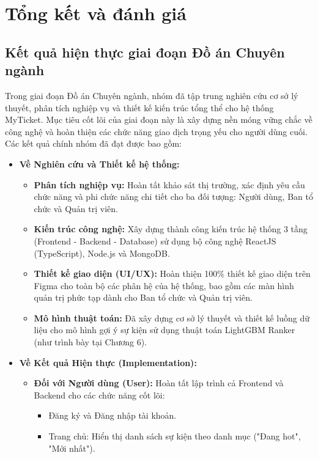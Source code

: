 \section{Tổng kết và đánh giá}
\subsection{Kết quả hiện thực giai đoạn Đồ án Chuyên ngành}
\indent \indent Trong giai đoạn Đồ án Chuyên ngành, nhóm đã tập trung nghiên cứu cơ sở lý thuyết, phân tích nghiệp vụ và thiết kế kiến trúc tổng thể cho hệ thống MyTicket. Mục tiêu cốt lõi của giai đoạn này là xây dựng nền móng vững chắc về công nghệ và hoàn thiện các chức năng giao dịch trọng yếu cho người dùng cuối.\\
\indent Các kết quả chính nhóm đã đạt được bao gồm:
\begin{itemize}
    \item[-] \textbf{Về Nghiên cứu và Thiết kế hệ thống:}
    \begin{itemize}
        \item[1.] \textbf{Phân tích nghiệp vụ:} Hoàn tất khảo sát thị trường, xác định yêu cầu chức năng và phi chức năng chi tiết cho ba đối tượng: Người dùng, Ban tổ chức và Quản trị viên.
        \item[2.] \textbf{Kiến trúc công nghệ:} Xây dựng thành công kiến trúc hệ thống 3 tầng (Frontend - Backend - Database) sử dụng bộ công nghệ ReactJS (TypeScript), Node.js và MongoDB.
        \item[3.] \textbf{Thiết kế giao diện (UI/UX):} Hoàn thiện 100\% thiết kế giao diện trên Figma cho toàn bộ các phân hệ của hệ thống, bao gồm các màn hình quản trị phức tạp dành cho Ban tổ chức và Quản trị viên.
        \item[4.] \textbf{Mô hình thuật toán:} Đã xây dựng cơ sở lý thuyết và thiết kế luồng dữ liệu cho mô hình gợi ý sự kiện sử dụng thuật toán LightGBM Ranker (như trình bày tại Chương 6).
    \end{itemize}
    \item[-] \textbf{Về Kết quả Hiện thực (Implementation):}
    \begin{itemize}
        \item[1.] \textbf{Đối với Người dùng (User):} Hoàn tất lập trình cả Frontend và Backend cho các chức năng cốt lõi:
        \begin{itemize}
            \item[-] Đăng ký và Đăng nhập tài khoản.
            \item[-] Trang chủ: Hiển thị danh sách sự kiện theo danh mục ("Đang hot", "Mới nhất").

\end{itemize}
\end{itemize}
\end{itemize}
